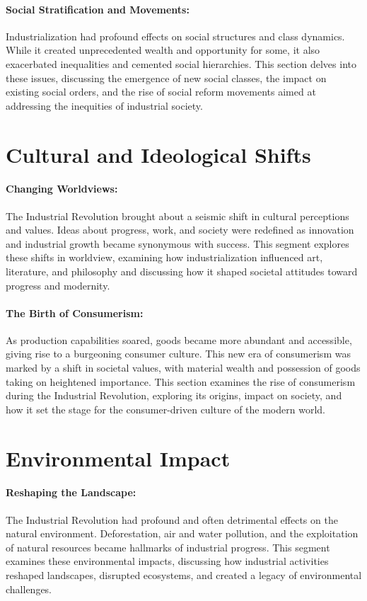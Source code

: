 \documentclass[a4paper,12pt]{book}
\begin{document}
\paragraph{Social Stratification and Movements:}
Industrialization had profound effects on social structures and class dynamics. While it created unprecedented wealth and opportunity for some, it also exacerbated inequalities and cemented social hierarchies. This section delves into these issues, discussing the emergence of new social classes, the impact on existing social orders, and the rise of social reform movements aimed at addressing the inequities of industrial society.

\section*{Cultural and Ideological Shifts}

\paragraph{Changing Worldviews:}
The Industrial Revolution brought about a seismic shift in cultural perceptions and values. Ideas about progress, work, and society were redefined as innovation and industrial growth became synonymous with success. This segment explores these shifts in worldview, examining how industrialization influenced art, literature, and philosophy and discussing how it shaped societal attitudes toward progress and modernity.

\paragraph{The Birth of Consumerism:}
As production capabilities soared, goods became more abundant and accessible, giving rise to a burgeoning consumer culture. This new era of consumerism was marked by a shift in societal values, with material wealth and possession of goods taking on heightened importance. This section examines the rise of consumerism during the Industrial Revolution, exploring its origins, impact on society, and how it set the stage for the consumer-driven culture of the modern world.

\section*{Environmental Impact}

\paragraph{Reshaping the Landscape:}
The Industrial Revolution had profound and often detrimental effects on the natural environment. Deforestation, air and water pollution, and the exploitation of natural resources became hallmarks of industrial progress. This segment examines these environmental impacts, discussing how industrial activities reshaped landscapes, disrupted ecosystems, and created a legacy of environmental challenges.
\end{document}
